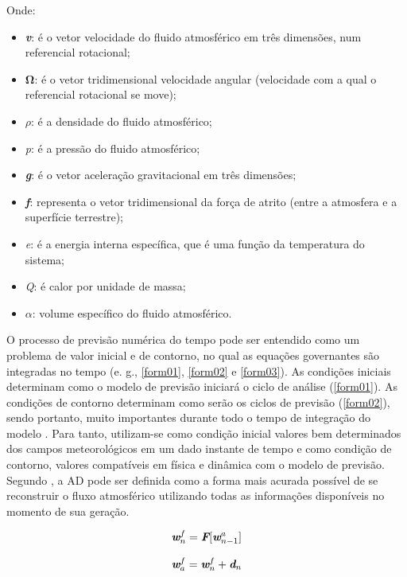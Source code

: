 Onde:

\begin{itemize}
\item \textbf{\textit{v}}: é o vetor velocidade do fluido atmosférico em três dimensões, num referencial rotacional;
\item $\mathbf{\Omega}$: é o vetor tridimensional velocidade angular (velocidade com a qual o referencial rotacional se move);
\item $\rho$: é a densidade do fluido atmosférico;
\item \textit{p}: é a pressão do fluido atmosférico;
\item \textbf{\textit{g}}: é o vetor aceleração gravitacional em três dimensões;
\item \textbf{\textit{f}}: representa o vetor tridimensional da força de atrito (entre a atmosfera e a superfície terrestre);
\item \textit{e}: é a energia interna específica, que é uma função da temperatura do sistema;
\item \textit{Q}: é calor por unidade de massa;
\item $\alpha$: volume específico do fluido atmosférico. 
\end{itemize}

O processo de previsão numérica do tempo pode ser entendido como um problema de valor inicial e de contorno, no qual as equações governantes são integradas no tempo (e. g., \autoref{form01}, \autoref{form02} e \autoref{form03}). As condições iniciais determinam como o modelo de previsão iniciará o ciclo de análise (\autoref{form01}). As condições de contorno determinam como serão os ciclos de previsão (\autoref{form02}), sendo portanto, muito importantes durante todo o tempo de integração do modelo \cite{nowosad2001}. Para tanto, utilizam-se como condição inicial valores bem determinados dos campos meteorológicos em um dado instante de tempo e como condição de contorno, valores compatíveis em física e dinâmica com o modelo de previsão. Segundo \cite{talagrand1997}, a AD pode ser definida como a forma mais acurada possível de se reconstruir o fluxo atmosférico utilizando todas as informações disponíveis no momento de sua geração. 

\begin{equation}
\textit{\textbf{w}}^{f}_{n}=\textit{\textbf{F}}[\textit{\textbf{w}}^{a}_{n-1}]
 \label{form04}
\end{equation}

\begin{equation}
\textit{\textbf{w}}^{f}_{a}=\textit{\textbf{w}}^{f}_{n}+\textit{\textbf{d}}_{n}
 \label{form05}
\end{equation}

